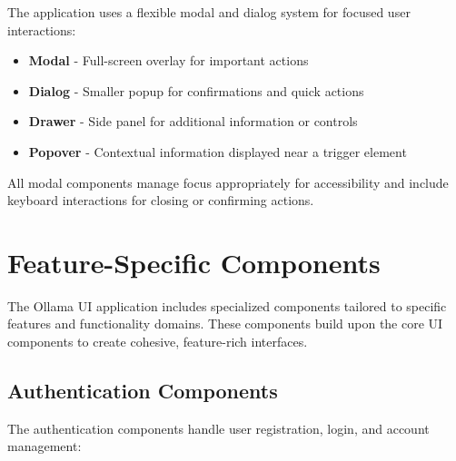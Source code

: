 The application uses a flexible modal and dialog system for focused user interactions:

\begin{itemize}
  \item \textbf{Modal} - Full-screen overlay for important actions
  \item \textbf{Dialog} - Smaller popup for confirmations and quick actions
  \item \textbf{Drawer} - Side panel for additional information or controls
  \item \textbf{Popover} - Contextual information displayed near a trigger element
\end{itemize}

All modal components manage focus appropriately for accessibility and include keyboard interactions for closing or confirming actions.

\section{Feature-Specific Components}

The Ollama UI application includes specialized components tailored to specific features and functionality domains. These components build upon the core UI components to create cohesive, feature-rich interfaces.

\subsection{Authentication Components}

The authentication components handle user registration, login, and account management:

